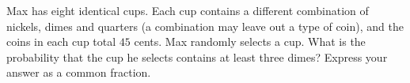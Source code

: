 Max has eight identical cups. Each cup contains a different combination of nickels, dimes and quarters (a combination may leave out a type of coin), and the coins in each cup total $45$ cents. Max randomly selects a cup. What is the probability that the cup he selects contains at least three dimes? Express your answer as a common fraction.
